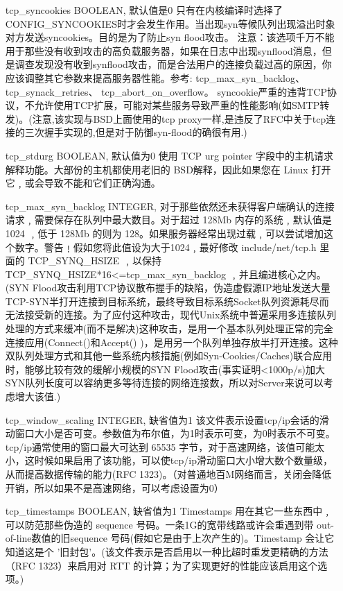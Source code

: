 \begin{enumerate}
\item[tcp\_syncookies] BOOLEAN,
默认值是0
只有在内核编译时选择了CONFIG\_SYNCOOKIES时才会发生作用。当出现syn等候队列出现溢出时象对方发送syncookies。目的是为了防止syn flood攻击。
注意：该选项千万不能用于那些没有收到攻击的高负载服务器，如果在日志中出现synflood消息，但是调查发现没有收到synflood攻击，而是合法用户的连接负载过高的原因，你应该调整其它参数来提高服务器性能。参考:
    tcp\_max\_syn\_backlog、
    tcp\_synack\_retries、
    tcp\_abort\_on\_overflow。
syncookie严重的违背TCP协议，不允许使用TCP扩展，可能对某些服务导致严重的性能影响(如SMTP转发)。(注意,该实现与BSD上面使用的tcp proxy一样,是违反了RFC中关于tcp连接的三次握手实现的,但是对于防御syn-flood的确很有用.)

\item[tcp\_stdurg] BOOLEAN,
默认值为0
使用 TCP urg pointer 字段中的主机请求解释功能。大部份的主机都使用老旧的 BSD解释，因此如果您在 Linux 打开它﹐或会导致不能和它们正确沟通。

\item[tcp\_max\_syn\_backlog] INTEGER,
对于那些依然还未获得客户端确认的连接请求﹐需要保存在队列中最大数目。对于超过 128Mb 内存的系统﹐默认值是1024 ﹐低于 128Mb 的则为 128。如果服务器经常出现过载﹐可以尝试增加这个数字。警告﹗假如您将此值设为大于1024﹐最好修改 include/net/tcp.h 里面的 TCP\_SYNQ\_HSIZE ﹐以保持TCP\_SYNQ\_HSIZE*16<=tcp\_max\_syn\_backlog ﹐并且编进核心之内。(SYN Flood攻击利用TCP协议散布握手的缺陷，伪造虚假源IP地址发送大量TCP-SYN半打开连接到目标系统，最终导致目标系统Socket队列资源耗尽而无法接受新的连接。为了应付这种攻击，现代Unix系统中普遍采用多连接队列处理的方式来缓冲(而不是解决)这种攻击，是用一个基本队列处理正常的完全连接应用(Connect()和Accept() )，是用另一个队列单独存放半打开连接。这种双队列处理方式和其他一些系统内核措施(例如Syn-Cookies/Caches)联合应用时，能够比较有效的缓解小规模的SYN Flood攻击(事实证明<1000p/s)加大SYN队列长度可以容纳更多等待连接的网络连接数，所以对Server来说可以考虑增大该值.)

\item[tcp\_window\_scaling] INTEGER,
缺省值为1
该文件表示设置tcp/ip会话的滑动窗口大小是否可变。参数值为布尔值，为1时表示可变，为0时表示不可变。tcp/ip通常使用的窗口最大可达到 65535 字节，对于高速网络，该值可能太小，这时候如果启用了该功能，可以使tcp/ip滑动窗口大小增大数个数量级，从而提高数据传输的能力(RFC 1323)。（对普通地百M网络而言，关闭会降低开销，所以如果不是高速网络，可以考虑设置为0）

\item[tcp\_timestamps] BOOLEAN,
缺省值为1
Timestamps 用在其它一些东西中﹐可以防范那些伪造的 sequence 号码。一条1G的宽带线路或许会重遇到带 out-of-line数值的旧sequence 号码(假如它是由于上次产生的)。Timestamp 会让它知道这是个 '旧封包'。(该文件表示是否启用以一种比超时重发更精确的方法（RFC 1323）来启用对 RTT 的计算；为了实现更好的性能应该启用这个选项。)


\end{enumerate}

